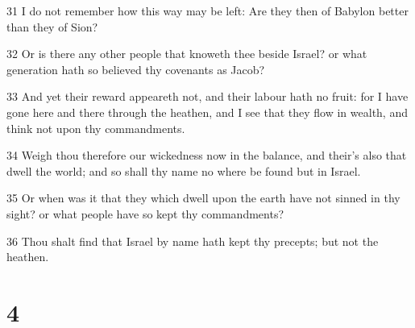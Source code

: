 \par 31 I do not remember how this way may be left: Are they then of Babylon better than they of Sion?
\par 32 Or is there any other people that knoweth thee beside Israel? or what generation hath so believed thy covenants as Jacob?
\par 33 And yet their reward appeareth not, and their labour hath no fruit: for I have gone here and there through the heathen, and I see that they flow in wealth, and think not upon thy commandments.
\par 34 Weigh thou therefore our wickedness now in the balance, and their's also that dwell the world; and so shall thy name no where be found but in Israel.
\par 35 Or when was it that they which dwell upon the earth have not sinned in thy sight? or what people have so kept thy commandments?
\par 36 Thou shalt find that Israel by name hath kept thy precepts; but not the heathen.

\chapter{4}

